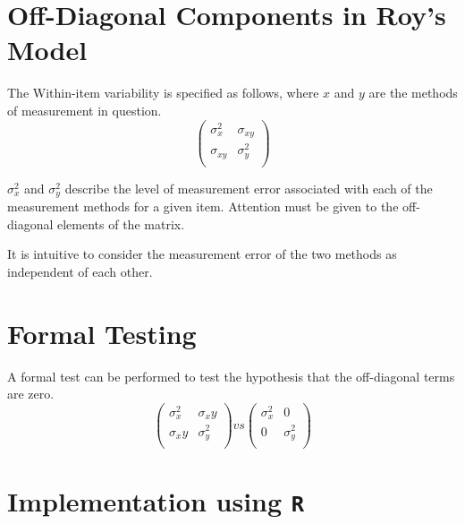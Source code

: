 \documentclass{article}
\begin{document}
\section{Off-Diagonal Components in Roy's Model}

The Within-item variability is specified as follows, where $x$ and $y$ are the methods of measurement in question.
\[ \left(
     \begin{array}{cc}
       \sigma^2_x & \sigma_{xy} \\
       \sigma_{xy} & \sigma^2_y \\
     \end{array}
   \right)
 \]

$\sigma^2_x$ and $\sigma^2_y$ describe the level of measurement error associated with each of the measurement methods for a given item. Attention must be given to the off-diagonal elements of the matrix.

It is intuitive to consider the measurement error of the two methods as independent of each other.

\section{Formal Testing}
A formal test can be performed to test the hypothesis that the off-diagonal terms are zero.
\[ \left(
     \begin{array}{cc}
       \sigma^2_x & \sigma_xy \\
       \sigma_xy & \sigma^2_y \\
     \end{array}
   \right) vs \left(
     \begin{array}{cc}
       \sigma^2_x & 0 \\
       0 & \sigma^2_y \\
     \end{array}
   \right)
 \]


\section{Implementation using \texttt{R}}
\end{document}
